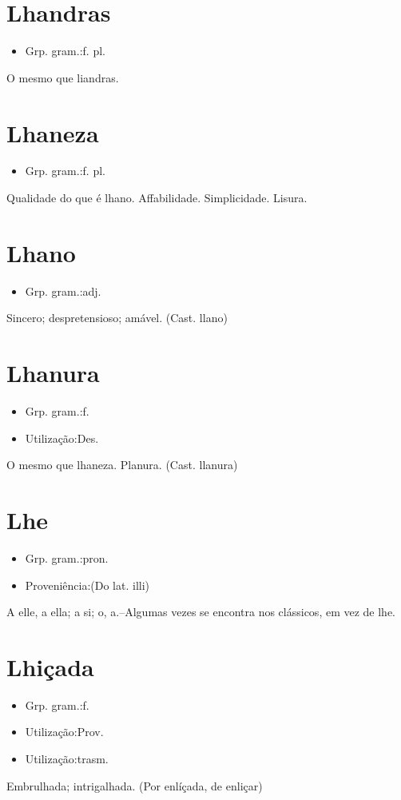 \section{Lhandras}
\begin{itemize}
\item {Grp. gram.:f. pl.}
\end{itemize}
O mesmo que \textunderscore liandras\textunderscore .
\section{Lhaneza}
\begin{itemize}
\item {Grp. gram.:f. pl.}
\end{itemize}
Qualidade do que é lhano.
Affabilidade.
Simplicidade.
Lisura.
\section{Lhano}
\begin{itemize}
\item {Grp. gram.:adj.}
\end{itemize}
Sincero; despretensioso; amável.
(Cast. \textunderscore llano\textunderscore )
\section{Lhanura}
\begin{itemize}
\item {Grp. gram.:f.}
\end{itemize}
\begin{itemize}
\item {Utilização:Des.}
\end{itemize}
O mesmo que \textunderscore lhaneza\textunderscore .
Planura.
(Cast. \textunderscore llanura\textunderscore )
\section{Lhe}
\begin{itemize}
\item {Grp. gram.:pron.}
\end{itemize}
\begin{itemize}
\item {Proveniência:(Do lat. \textunderscore illi\textunderscore )}
\end{itemize}
A elle, a ella; a si; o, a.--Algumas vezes se encontra nos clássicos, em vez de \textunderscore lhe\textunderscore .
\section{Lhiçada}
\begin{itemize}
\item {Grp. gram.:f.}
\end{itemize}
\begin{itemize}
\item {Utilização:Prov.}
\end{itemize}
\begin{itemize}
\item {Utilização:trasm.}
\end{itemize}
Embrulhada; intrigalhada.
(Por \textunderscore enlíçada\textunderscore , de \textunderscore enliçar\textunderscore )
